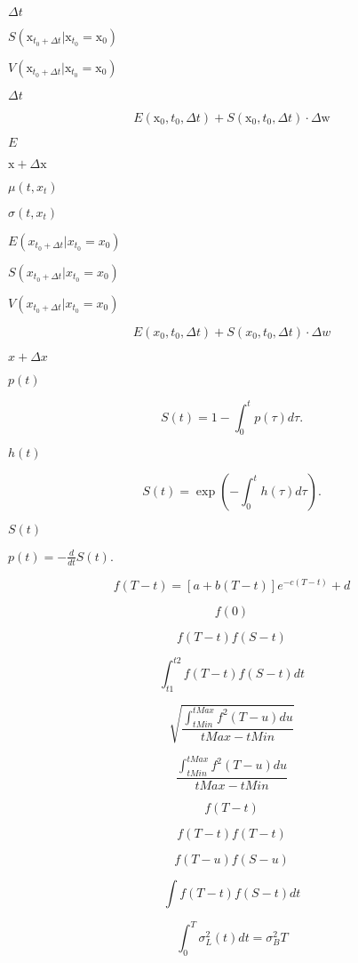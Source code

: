 \documentclass{article}
\begin{document}
$ \Delta t $
\pagebreak

$ S(\mathrm{x}_{t_0 + \Delta t}
    | \mathrm{x}_{t_0} = \mathrm{x}_0) $
\pagebreak

$ V(\mathrm{x}_{t_0 + \Delta t}
    | \mathrm{x}_{t_0} = \mathrm{x}_0) $
\pagebreak

$ \Delta t
$
\pagebreak

\[E(\mathrm{x}_0,t_0,\Delta t) +
S(\mathrm{x}_0,t_0,\Delta t) \cdot \Delta \mathrm{w}
\]
\pagebreak

$ E $
\pagebreak

$ \mathrm{x} + \Delta \mathrm{x} $
\pagebreak

$ \mu(t, x_t) $
\pagebreak

$ \sigma(t, x_t) $
\pagebreak

$ E(x_{t_0 + \Delta t} | x_{t_0} = x_0) $
\pagebreak

$ S(x_{t_0 + \Delta t} | x_{t_0} = x_0) $
\pagebreak

$ V(x_{t_0 + \Delta t} | x_{t_0} = x_0) $
\pagebreak

\[E(x_0,t_0,\Delta t) + S(x_0,t_0,\Delta t) \cdot \Delta w
\]
\pagebreak

$ x + \Delta x $
\pagebreak

$ p(t) $
\pagebreak

\[S(t) = 1 - \int_0^t p(\tau) d\tau.
\]
\pagebreak

$ h(t) $
\pagebreak

\[S(t) = \exp\left( - \int_0^t h(\tau) d\tau \right).
\]
\pagebreak

$ S(t) $
\pagebreak

$ p(t) = -\frac{d}{dt} S(t). $
\pagebreak

\[ f(T-t) = [ a + b(T-t) ] e^{-c(T-t)} + d \]
\pagebreak

\[ f(0) \]
\pagebreak

\[ f(T-t)f(S-t) \]
\pagebreak

\[ \int_{t1}^{t2} f(T-t)f(S-t)dt \]
\pagebreak

\[ \sqrt{ \frac{\int_{tMin}^{tMax} f^2(T-u)du}{tMax-tMin} } \]
\pagebreak

\[ \frac{\int_{tMin}^{tMax} f^2(T-u)du}{tMax-tMin} \]
\pagebreak

\[ f(T-t) \]
\pagebreak

\[ f(T-t)f(T-t) \]
\pagebreak

\[ f(T-u)f(S-u) \]
\pagebreak

\[ \int f(T-t)f(S-t)dt \]
\pagebreak

\[    \int_0^T \sigma_L^2(t)dt = \sigma_B^2 T
\]
\pagebreak
\end{document}
